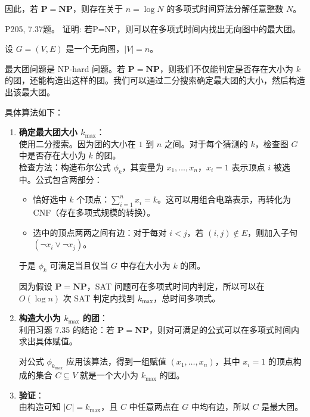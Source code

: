 \documentclass[11pt,addpoints,answers]{exam}
\begin{document}
\begin{questions}
\begin{solution}
    因此，若 $\mathbf{P} = \mathbf{NP}$，则存在关于 $n = \log N$ 的多项式时间算法分解任意整数 $N$。
\end{solution}

\question P205, 7.37题。
证明: 若P=NP，则可以在多项式时间内找出无向图中的最大团。
\begin{solution}

	设 $G = (V, E)$ 是一个无向图，$|V| = n$。

     最大团问题是 NP-hard 问题。若 $\mathbf{P} = \mathbf{NP}$，则我们不仅能判定是否存在大小为 $k$ 的团，还能构造出这样的团。我们可以通过二分搜索确定最大团的大小，然后构造出该最大团。
    
    具体算法如下：
    
    \begin{enumerate}
        \item \textbf{确定最大团大小 $k_{\max}$}： \\
        使用二分搜索。因为团的大小在 $1$ 到 $n$ 之间。对于每个猜测的 $k$，检查图 $G$ 中是否存在大小为 $k$ 的团。\\
        
        检查方法：构造布尔公式 $\phi_k$，其变量为 $x_1, \dots, x_n$，$x_i = 1$ 表示顶点 $i$ 被选中。公式包含两部分：
        \begin{itemize}
            \item 恰好选中 $k$ 个顶点：$\sum_{i=1}^n x_i = k$。这可以用组合电路表示，再转化为 CNF（存在多项式规模的转换）。
            \item 选中的顶点两两之间有边：对于每对 $i<j$，若 $(i,j) \notin E$，则加入子句 $(\neg x_i \vee \neg x_j)$。
        \end{itemize}
        于是 $\phi_k$ 可满足当且仅当 $G$ 中存在大小为 $k$ 的团。
        
        因为假设 $\mathbf{P} = \mathbf{NP}$，SAT 问题可在多项式时间内判定，所以可以在 $O(\log n)$ 次 SAT 判定内找到 $k_{\max}$，总时间多项式。
    
        \item \textbf{构造大小为 $k_{\max}$ 的团}：\\
        利用习题 7.35 的结论：若 $\mathbf{P} = \mathbf{NP}$，则对可满足的公式可以在多项式时间内求出具体赋值。
        
        对公式 $\phi_{k_{\max}}$ 应用该算法，得到一组赋值 $(x_1, \dots, x_n)$，其中 $x_i = 1$ 的顶点构成的集合 $C \subseteq V$ 就是一个大小为 $k_{\max}$ 的团。
        
        \item \textbf{验证}：\\
        由构造可知 $|C| = k_{\max}$，且 $C$ 中任意两点在 $G$ 中均有边，所以 $C$ 是最大团。
    \end{enumerate}
    

\end{solution}
\end{questions}
\end{document}
